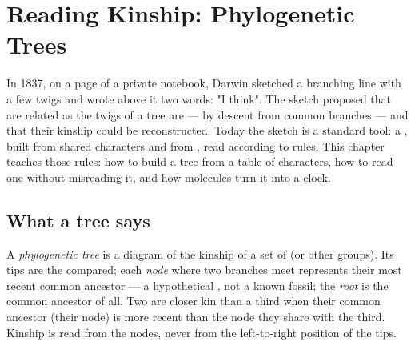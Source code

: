 \chapter{Reading Kinship: Phylogenetic Trees}\label{ch:g12:phylogenetic-trees}

In 1837, on a page of a private notebook, Darwin sketched a branching
line with a few twigs and wrote above it two words: "I think". The
sketch proposed that  are related as the twigs of a tree are ---
by descent from common branches --- and that their kinship could be
reconstructed. Today the sketch is a standard tool: a , built from shared characters and from , read according to
rules. This chapter teaches those rules: how to build a tree from a
table of characters, how to read one without misreading it, and how
molecules turn it into a clock.

\section{What a tree says}

\begin{definition}\label{def:g12:phylogenetic-trees:tree}
A \emph{phylogenetic tree} is a diagram of the
kinship of a set of  (or other groups). Its tips are the 
compared; each \emph{node} where two branches meet represents their
most recent common ancestor --- a hypothetical , not a known
fossil; the \emph{root} is the common ancestor of all. Two  are
closer kin than a third when their common ancestor (their node) is more
recent than the node they share with the third. Kinship is read from
the nodes, never from the left-to-right position of the tips.
\end{definition}

